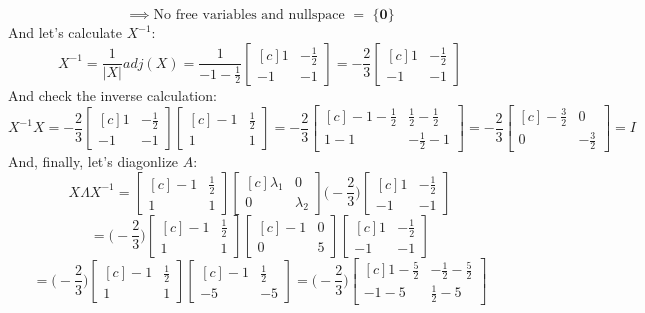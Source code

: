 \documentclass{tufte-handout}
\begin{document}
\[
\implies
\text{No free variables and nullspace $=$ \{$\mathbf{0}$\}}
\]
And let's calculate $X^{-1}$:
\[
X^{-1}=\frac{1}{\vert X\vert}adj(X)=
\frac{1}{-1-\frac{1}{2}}
\begin{bmatrix*}[c] 1&-\frac{1}{2}\\-1&-1 \end{bmatrix*}
=
-\frac{2}{3}
\begin{bmatrix*}[c] 1&-\frac{1}{2}\\-1&-1 \end{bmatrix*}
\]
And check the inverse calculation:
\[
X^{-1}X=
-\frac{2}{3}
\begin{bmatrix*}[c] 1&-\frac{1}{2}\\-1&-1 \end{bmatrix*}
\begin{bmatrix*}[c] -1&\frac{1}{2}\\1&1 \end{bmatrix*}
=
-\frac{2}{3}
\begin{bmatrix*}[c] -1-\frac{1}{2}&\frac{1}{2}-\frac{1}{2}\\1-1&-\frac{1}{2}-1 \end{bmatrix*}
=
-\frac{2}{3}
\begin{bmatrix*}[c] -\frac{3}{2}&0\\0&-\frac{3}{2} \end{bmatrix*}
=I
\]
And, finally, let's diagonlize $A$:
\[
X\Lambda X^{-1}=
\begin{bmatrix*}[c] -1&\frac{1}{2}\\1&1 \end{bmatrix*}
\begin{bmatrix*}[c] \lambda_1&0\\0&\lambda_2 \end{bmatrix*}
\Big(-\frac{2}{3}\Big)
\begin{bmatrix*}[c] 1&-\frac{1}{2}\\-1&-1 \end{bmatrix*}
\]
\[
=
\Big(-\frac{2}{3}\Big)
\begin{bmatrix*}[c] -1&\frac{1}{2}\\1&1 \end{bmatrix*}
\begin{bmatrix*}[c] -1&0\\0&5 \end{bmatrix*}
\begin{bmatrix*}[c] 1&-\frac{1}{2}\\-1&-1 \end{bmatrix*}
\]
\[
=
\Big(-\frac{2}{3}\Big)
\begin{bmatrix*}[c] -1&\frac{1}{2}\\1&1 \end{bmatrix*}
\begin{bmatrix*}[c] -1&\frac{1}{2}\\-5&-5 \end{bmatrix*}
=
\Big(-\frac{2}{3}\Big)
\begin{bmatrix*}[c] 1-\frac{5}{2}&-\frac{1}{2}-\frac{5}{2}\\-1-5&\frac{1}{2}-5 \end{bmatrix*}
\]
\end{document}

